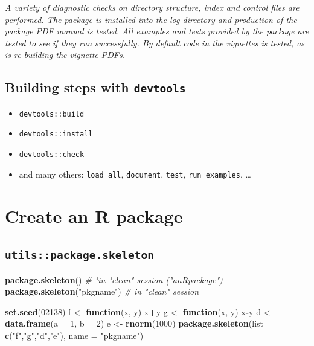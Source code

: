 \documentclass[]{book}
\newenvironment{Shaded}{\begin{snugshade}}{\end{snugshade}}
\newcommand{\KeywordTok}[1]{\textcolor[rgb]{0.13,0.29,0.53}{\textbf{#1}}}
\newcommand{\DataTypeTok}[1]{\textcolor[rgb]{0.13,0.29,0.53}{#1}}
\newcommand{\DecValTok}[1]{\textcolor[rgb]{0.00,0.00,0.81}{#1}}
\newcommand{\StringTok}[1]{\textcolor[rgb]{0.31,0.60,0.02}{#1}}
\newcommand{\CommentTok}[1]{\textcolor[rgb]{0.56,0.35,0.01}{\textit{#1}}}
\newcommand{\ControlFlowTok}[1]{\textcolor[rgb]{0.13,0.29,0.53}{\textbf{#1}}}
\newcommand{\OperatorTok}[1]{\textcolor[rgb]{0.81,0.36,0.00}{\textbf{#1}}}
\newcommand{\NormalTok}[1]{#1}
\theoremstyle{definition}
\theoremstyle{definition}
\theoremstyle{definition}
\theoremstyle{remark}
\begin{document}
\emph{A variety of diagnostic checks on directory structure, index and
control files are performed. The package is installed into the log
directory and production of the package PDF manual is tested. All
examples and tests provided by the package are tested to see if they run
successfully. By default code in the vignettes is tested, as is
re-building the vignette PDFs.}

\subsection{\texorpdfstring{Building steps with
\texttt{devtools}}{Building steps with devtools}}\label{building-steps-with-devtools}

\begin{itemize}
\item
  \texttt{devtools::build}
\item
  \texttt{devtools::install}
\item
  \texttt{devtools::check}
\item
  and many others: \texttt{load\_all}, \texttt{document}, \texttt{test},
  \texttt{run\_examples}, \ldots{}
\end{itemize}

\section{Create an R package}\label{create-an-r-package}

\subsection{\texorpdfstring{\texttt{utils::package.skeleton}}{utils::package.skeleton}}\label{utilspackage.skeleton}

\begin{Shaded}
\begin{Highlighting}[]
\KeywordTok{package.skeleton}\NormalTok{() }\CommentTok{# "in "clean" session ("anRpackage")}
\KeywordTok{package.skeleton}\NormalTok{(}\StringTok{"pkgname"}\NormalTok{) }\CommentTok{# in "clean" session}

\KeywordTok{set.seed}\NormalTok{(}\DecValTok{02138}\NormalTok{)}
\NormalTok{f <-}\StringTok{ }\ControlFlowTok{function}\NormalTok{(x, y) x}\OperatorTok{+}\NormalTok{y}
\NormalTok{g <-}\StringTok{ }\ControlFlowTok{function}\NormalTok{(x, y) x}\OperatorTok{-}\NormalTok{y}
\NormalTok{d <-}\StringTok{ }\KeywordTok{data.frame}\NormalTok{(}\DataTypeTok{a =} \DecValTok{1}\NormalTok{, }\DataTypeTok{b =} \DecValTok{2}\NormalTok{)}
\NormalTok{e <-}\StringTok{ }\KeywordTok{rnorm}\NormalTok{(}\DecValTok{1000}\NormalTok{)}
\KeywordTok{package.skeleton}\NormalTok{(}\DataTypeTok{list =} \KeywordTok{c}\NormalTok{(}\StringTok{"f"}\NormalTok{,}\StringTok{"g"}\NormalTok{,}\StringTok{"d"}\NormalTok{,}\StringTok{"e"}\NormalTok{), }\DataTypeTok{name =} \StringTok{"pkgname"}\NormalTok{)}
\end{Highlighting}
\end{Shaded}
\end{document}
